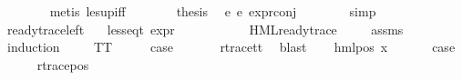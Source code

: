 \begin{isabellebody}
\ \ \ \ \ \ \isamarkupfalse%
\ {\isacharparenleft}{\kern0pt}metis\ le{\isacharunderscore}{\kern0pt}sup{\isacharunderscore}{\kern0pt}iff{\isacharparenright}{\kern0pt}\isanewline
\ \ \ \ \isamarkupfalse%
\ \isamarkupfalse%
\ {\isacharquery}{\kern0pt}thesis\ \isamarkupfalse%
\ e{}\ e{}\ expr{\isacharunderscore}{\kern0pt}{}{\isacharunderscore}{\kern0pt}conj\isanewline
\ \ \ \ \ \ \isamarkupfalse%
\ simp\isanewline
\ \ \isamarkupfalse%
\isanewline
{}\isamarkupfalse%
%
\endisatagproof
{\isafoldproof}%
%
\isadelimproof
\isanewline
%
\endisadelimproof
\isanewline
{}\isamarkupfalse%
\ ready{\isacharunderscore}{\kern0pt}trace{\isacharunderscore}{\kern0pt}left{\isacharcolon}{\kern0pt}\isanewline
\ \ \ {\isachardoublequoteopen}less{\isacharunderscore}{\kern0pt}eq{\isacharunderscore}{\kern0pt}t\ {\isacharparenleft}{\kern0pt}expr\ {\isasymphi}{\isacharparenright}{\kern0pt}\ {\isacharparenleft}{\kern0pt}{\isasyminfinity}{\isacharcomma}{\kern0pt}\ {\isasyminfinity}{\isacharcomma}{\kern0pt}\ {\isasyminfinity}{\isacharcomma}{\kern0pt}\ {}{\isacharcomma}{\kern0pt}\ {}{\isacharcomma}{\kern0pt}\ {}{\isacharparenright}{\kern0pt}{\isachardoublequoteclose}\ \isanewline
\ \ \ {\isachardoublequoteopen}HML{\isacharunderscore}{\kern0pt}ready{\isacharunderscore}{\kern0pt}trace\ {\isasymphi}{\isachardoublequoteclose}\isanewline
%
\isadelimproof
\ \ %
\endisadelimproof
%
\isatagproof
{}\isamarkupfalse%
\ assms\isanewline
{}\isamarkupfalse%
\ {\isacharparenleft}{\kern0pt}induction\ {\isasymphi}{\isacharparenright}{\kern0pt}\isanewline
\ \ \isamarkupfalse%
\ TT\isanewline
\ \ \isamarkupfalse%
\ \isamarkupfalse%
\ {\isacharquery}{\kern0pt}case\ \isanewline
\ \ \ \ \isamarkupfalse%
\ r{\isacharunderscore}{\kern0pt}trace{\isacharunderscore}{\kern0pt}tt\ \isamarkupfalse%
\ blast\isanewline
{}\isamarkupfalse%
\isanewline
\ \ \isamarkupfalse%
\ {\isacharparenleft}{\kern0pt}hml{\isacharunderscore}{\kern0pt}pos\ x{}\ {\isasymphi}{\isacharparenright}{\kern0pt}\isanewline
\ \ \isamarkupfalse%
\ \isamarkupfalse%
\ {\isacharquery}{\kern0pt}case\isanewline
\ \ \ \ \isamarkupfalse%
\ r{\isacharunderscore}{\kern0pt}trace{\isacharunderscore}{\kern0pt}pos\ \isamarkupfalse%

\end{isabellebody}
